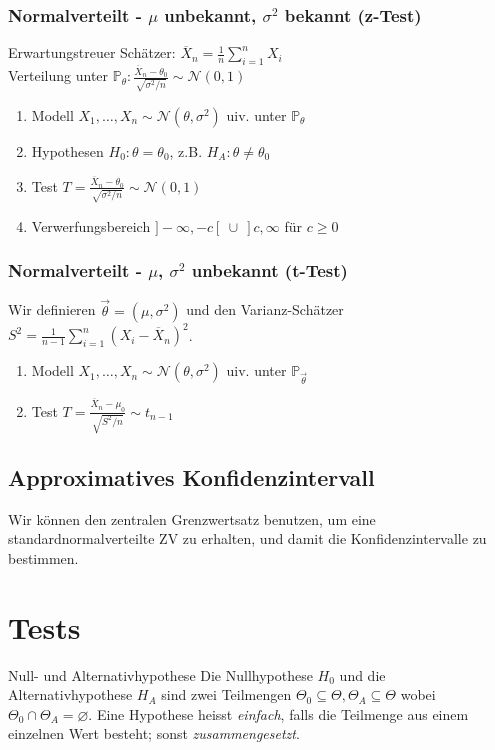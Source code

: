\documentclass[a4paper,10pt]{article}
\def\P{\mathbb{P}}
\begin{document}
\subsubsection*{\texorpdfstring{Normalverteilt - \(\mu\) unbekannt, \(\sigma^2\) bekannt (z-Test)}{Normalverteilt - μ unbekannt, σ² bekannt (z-Test)}}
Erwartungstreuer Schätzer: \(\overline{X}_n = \frac{1}{n} \sum_{i=1}^n X_i\)\\
Verteilung unter \(\P_\theta: \frac{\overline{X}_n - \theta_0}{\sqrt{\sigma^2/n}} \sim \mathcal{N}(0,1)\)
\begin{enumerate}
	\item Modell \(X_1, \ldots, X_n \sim \mathcal{N}(\theta, \sigma^2)\) uiv. unter \(\P_\theta\)
	\item Hypothesen \(H_0 : \theta = \theta_0\), z.B. \(H_A : \theta \ne \theta_0\)
	\item Test \(T = \frac{\overline{X}_n - \theta_0}{\sqrt{\sigma^2/n}} \sim \mathcal{N}(0,1)\)
	\item Verwerfungsbereich \(]-\infty, -c[ \ \cup \ ] c, \infty\) für \(c\ge 0\)
\end{enumerate}

\subsubsection*{\texorpdfstring{Normalverteilt - \(\mu\), \(\sigma^2\) unbekannt (t-Test)}{Normalverteilt - μ, σ² unbekannt (t-Test)}}
Wir definieren \(\vec{\theta} = (\mu, \sigma^2)\) und den Varianz-Schätzer \(S^2 = \frac{1}{n-1}\sum_{i=1}^n (X_i - \overline{X}_n)^2\).
\begin{enumerate}
	\item Modell \(X_1, \ldots, X_n \sim \mathcal{N}(\theta, \sigma^2)\) uiv. unter \(\P_{\vec{\theta}}\)
	\item Test \(T = \frac{\overline{X}_n - \mu_0}{\sqrt{S^2/n}} \sim t_{n-1}\)
\end{enumerate}

\subsection{Approximatives Konfidenzintervall}
Wir können den zentralen Grenzwertsatz benutzen, um eine standardnormalverteilte ZV zu erhalten, und damit die Konfidenzintervalle zu bestimmen.

\section{Tests}
\begin{subbox}{Null- und Alternativhypothese}
	Die Nullhypothese \(H_0\) und die Alternativhypothese \(H_A\) sind zwei Teilmengen \(\Theta_0 \subseteq \Theta, \Theta_A \subseteq \Theta\) wobei \(\Theta_0 \cap \Theta_A = \varnothing\). Eine Hypothese heisst \textit{einfach}, falls die Teilmenge aus einem einzelnen Wert besteht; sonst \textit{zusammengesetzt}.
\end{subbox}
\end{document}

